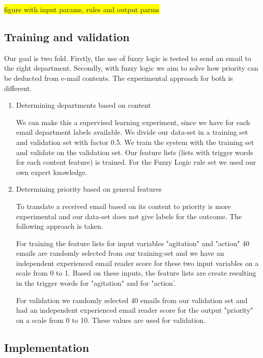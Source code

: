 \documentclass[journal]{IEEEtran}
\begin{document}
\colorbox{yellow}{figure with input params, rules and output parms}

\subsection{Training and validation}

Our goal is two fold. Firstly, the use of fuzzy logic is tested to send an email to the right department. Secondly, with fuzzy logic we aim to solve how priority can be deducted from e-mail contents. The experimental approach for both is different.

\begin{enumerate}
    \item{Determining departments based on content}

    We can make this a supervised learning experiment, since we have for each email department labels available. We divide our data-set in a training set and validation set with factor 0.5. We train the system with the training set and validate on the validation set. Our feature lists (lists with trigger words for each content feature) is trained. For the Fuzzy Logic rule set we used our own expert knowledge.

    \item{Determining priority based on general features}

    To translate a received email based on its content to priority is more experimental and our data-set does not give labels for the outcome. The following approach is taken.

    For training the feature lists for input variables "agitation" and "action" 40 emails are randomly selected from our training-set and we have an independent experienced email reader score for these two input variables on a scale from 0 to 1. Based on these inputs, the feature lists are create resulting in the trigger words for "agitation" and for "action'.

    For validation we randomly selected 40 emails from our validation set and had an independent experienced email reader score for the output "priority" on a scale from 0 to 10. These values are used for validation.

\end{enumerate}

\subsection{Implementation}
\end{document}
